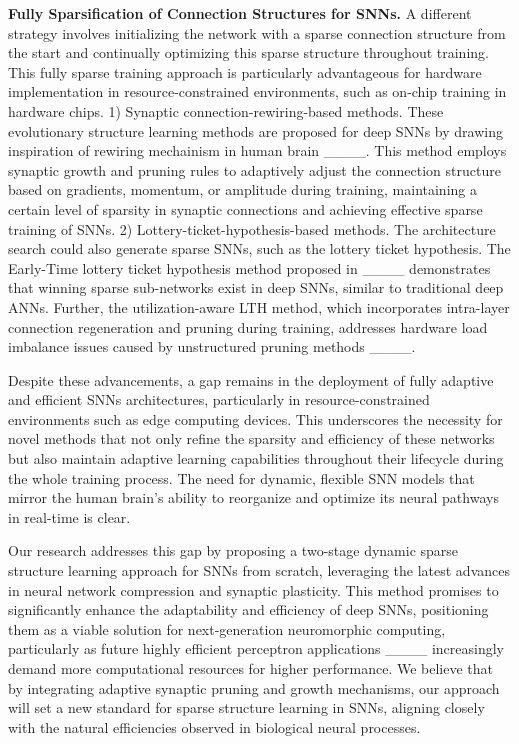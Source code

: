 \textbf{Fully Sparsification of Connection Structures for SNNs.} A different strategy involves initializing the network with a sparse connection structure from the start and continually optimizing this sparse structure throughout training. This fully sparse training approach is particularly advantageous for hardware implementation in resource-constrained environments, such as on-chip training in hardware chips. 1) Synaptic connection-rewiring-based methods. 
These evolutionary structure learning methods are proposed for deep SNNs by drawing inspiration of rewiring mechainism in human brain ____. This method employs synaptic growth and pruning rules to adaptively adjust the connection structure based on gradients, momentum, or amplitude during training, maintaining a certain level of sparsity in synaptic connections and achieving effective sparse training of SNNs. 2) Lottery-ticket-hypothesis-based methods. The architecture search could also generate sparse SNNs, such as the lottery ticket hypothesis. The Early-Time lottery ticket hypothesis method proposed in ____ demonstrates that winning sparse sub-networks exist in deep SNNs, similar to traditional deep ANNs. Further, the utilization-aware LTH method, which incorporates intra-layer connection regeneration and pruning during training, addresses hardware load imbalance issues caused by unstructured pruning methods ____.


Despite these advancements, a gap remains in the deployment of fully adaptive and efficient SNNs architectures, particularly in resource-constrained environments such as edge computing devices. This underscores the necessity for novel methods that not only refine the sparsity and efficiency of these networks but also maintain adaptive learning capabilities throughout their lifecycle during the whole training process. The need for dynamic, flexible SNN models that mirror the human brain’s ability to reorganize and optimize its neural pathways in real-time is clear.

Our research addresses this gap by proposing a two-stage dynamic sparse structure learning approach for SNNs from scratch, leveraging the latest advances in neural network compression and synaptic plasticity. This method promises to significantly enhance the adaptability and efficiency of deep SNNs, positioning them as a viable solution for next-generation neuromorphic computing, particularly as future highly efficient perceptron applications ____ increasingly demand more computational resources for higher performance.
We believe that by integrating adaptive synaptic pruning and growth mechanisms, our approach will set a new standard for sparse structure learning in SNNs, aligning closely with the natural efficiencies observed in biological neural processes.
